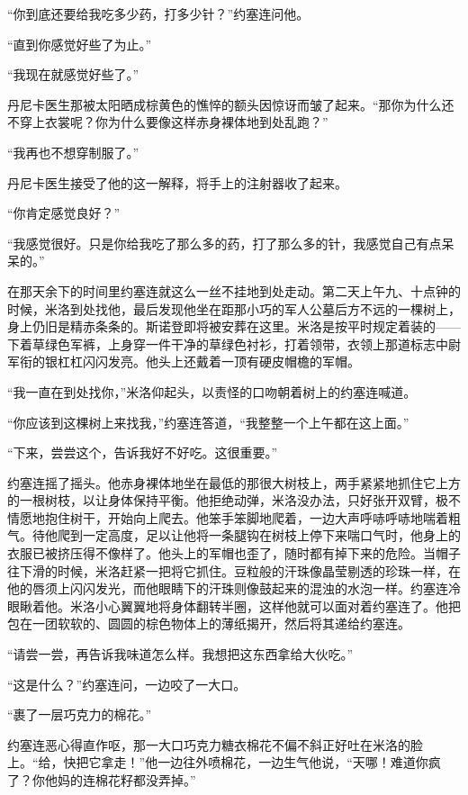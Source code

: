     “你到底还要给我吃多少药，打多少针？”约塞连问他。

    “直到你感觉好些了为止。”

    “我现在就感觉好些了。”

    丹尼卡医生那被太阳晒成棕黄色的憔悴的额头因惊讶而皱了起来。“那你为什么还不穿上衣裳呢？你为什么要像这样赤身裸体地到处乱跑？”

    “我再也不想穿制服了。”

    丹尼卡医生接受了他的这一解释，将手上的注射器收了起来。

    “你肯定感觉良好？”

    “我感觉很好。只是你给我吃了那么多的药，打了那么多的针，我感觉自己有点呆呆的。”

    在那天余下的时间里约塞连就这么一丝不挂地到处走动。第二天上午九、十点钟的时候，米洛到处找他，最后发现他坐在距那小巧的军人公墓后方不远的一棵树上，身上仍旧是精赤条条的。斯诺登即将被安葬在这里。米洛是按平时规定着装的——下着草绿色军裤，上身穿一件干净的草绿色衬衫，打着领带，衣领上那道标志中尉军衔的银杠杠闪闪发亮。他头上还戴着一顶有硬皮帽檐的军帽。

    “我一直在到处找你，”米洛仰起头，以责怪的口吻朝着树上的约塞连喊道。

    “你应该到这棵树上来找我，”约塞连答道，“我整整一个上午都在这上面。”

    “下来，尝尝这个，告诉我好不好吃。这很重要。”

    约塞连摇了摇头。他赤身裸体地坐在最低的那很大树枝上，两手紧紧地抓住它上方的一根树枝，以让身体保持平衡。他拒绝动弹，米洛没办法，只好张开双臂，极不情愿地抱住树干，开始向上爬去。他笨手笨脚地爬着，一边大声呼哧呼哧地喘着粗气。待他爬到一定高度，足以让他将一条腿钩在树枝上停下来喘口气时，他身上的衣服已被挤压得不像样了。他头上的军帽也歪了，随时都有掉下来的危险。当帽子往下滑的时候，米洛赶紧一把将它抓住。豆粒般的汗珠像晶莹剔透的珍珠一样，在他的唇须上闪闪发光，而他眼睛下的汗珠则像鼓起来的混浊的水泡一样。约塞连冷眼瞅着他。米洛小心翼翼地将身体翻转半圈，这样他就可以面对着约塞连了。他把包在一团软软的、圆圆的棕色物体上的薄纸揭开，然后将其递给约塞连。

    “请尝一尝，再告诉我味道怎么样。我想把这东西拿给大伙吃。”

    “这是什么？”约塞连问，一边咬了一大口。

    “裹了一层巧克力的棉花。”

    约塞连恶心得直作呕，那一大口巧克力糖衣棉花不偏不斜正好吐在米洛的脸上。“给，快把它拿走！”他一边往外喷棉花，一边生气他说，“天哪！难道你疯了？你他妈的连棉花籽都没弄掉。”

